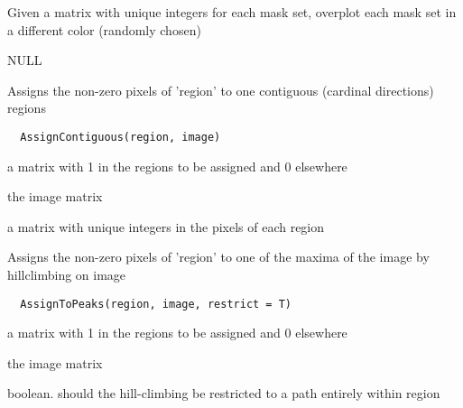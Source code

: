 \documentclass[a4paper]{book}
\begin{document}
%
\begin{Details}\relax
Given a matrix with unique integers for each mask set,
overplot each mask set in a different color (randomly
chosen)
\end{Details}
%
\begin{Value}
NULL
\end{Value}
%
\begin{Description}\relax
Assigns the non-zero pixels of 'region' to one contiguous
(cardinal directions) regions
\end{Description}
%
\begin{Usage}
\begin{verbatim}
  AssignContiguous(region, image)
\end{verbatim}
\end{Usage}
%
\begin{Arguments}
\begin{ldescription}
\item[\code{region}] a matrix with 1 in the regions to be
assigned and 0 elsewhere

\item[\code{image}] the image matrix
\end{ldescription}
\end{Arguments}
%
\begin{Value}
a matrix with unique integers in the pixels of each
region
\end{Value}
%
\begin{Description}\relax
Assigns the non-zero pixels of 'region' to one of the
maxima of the image by hillclimbing on image
\end{Description}
%
\begin{Usage}
\begin{verbatim}
  AssignToPeaks(region, image, restrict = T)
\end{verbatim}
\end{Usage}
%
\begin{Arguments}
\begin{ldescription}
\item[\code{region}] a matrix with 1 in the regions to be
assigned and 0 elsewhere

\item[\code{image}] the image matrix

\item[\code{restrict}] boolean.  should the hill-climbing be
restricted to a path entirely within region
\end{ldescription}
\end{Arguments}
\end{document}
